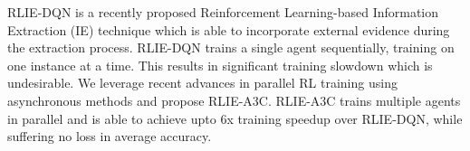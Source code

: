 RLIE-DQN is a recently proposed Reinforcement Learning-based Information Extraction (IE) technique which is able to incorporate external evidence during the extraction process. RLIE-DQN trains a single agent sequentially, training on one instance at a time. This results in significant training slowdown which is undesirable. We leverage recent advances in parallel RL training using asynchronous methods and propose RLIE-A3C. RLIE-A3C trains multiple agents in parallel and is able to achieve upto 6x training speedup over RLIE-DQN, while suffering no loss in average accuracy.
